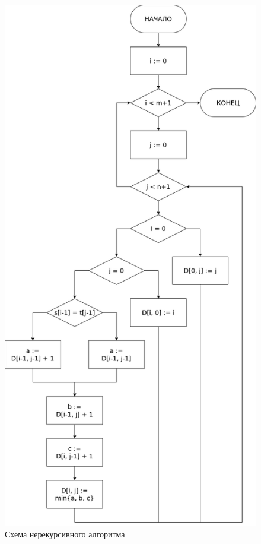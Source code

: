 \documentclass{report}
\begin{document}
\begin{figure}
    \centering
    \includegraphics[height=0.8\textheight]{alg-vl-iterative.png}
    \caption{Схема нерекурсивного алгоритма}
\end{figure}
\end{document}
